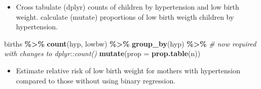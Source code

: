 \documentclass[
]{book}
\newenvironment{Shaded}{\begin{snugshade}}{\end{snugshade}}
\newcommand{\AttributeTok}[1]{\textcolor[rgb]{0.13,0.29,0.53}{#1}}
\newcommand{\CommentTok}[1]{\textcolor[rgb]{0.56,0.35,0.01}{\textit{#1}}}
\newcommand{\ConstantTok}[1]{\textcolor[rgb]{0.56,0.35,0.01}{#1}}
\newcommand{\DecValTok}[1]{\textcolor[rgb]{0.00,0.00,0.81}{#1}}
\newcommand{\FunctionTok}[1]{\textcolor[rgb]{0.13,0.29,0.53}{\textbf{#1}}}
\newcommand{\NormalTok}[1]{#1}
\newcommand{\OtherTok}[1]{\textcolor[rgb]{0.56,0.35,0.01}{#1}}
\newcommand{\SpecialCharTok}[1]{\textcolor[rgb]{0.81,0.36,0.00}{\textbf{#1}}}
\newcommand{\StringTok}[1]{\textcolor[rgb]{0.31,0.60,0.02}{#1}}
\providecommand{\tightlist}{%
  \setlength{\itemsep}{0pt}\setlength{\parskip}{0pt}}
\begin{document}
\begin{Shaded}
\end{Shaded}

\begin{itemize}
\tightlist
\item
  Cross tabulate (dplyr) counts of children by hypertension and low birth weight.
  calculate (mutate) proportions of low birth weigth children by hypertension.
\end{itemize}

\begin{Shaded}
\begin{Highlighting}[]
\NormalTok{births }\SpecialCharTok{\%\textgreater{}\%}
  \FunctionTok{count}\NormalTok{(hyp, lowbw) }\SpecialCharTok{\%\textgreater{}\%}
  \FunctionTok{group\_by}\NormalTok{(hyp) }\SpecialCharTok{\%\textgreater{}\%} \CommentTok{\# now required with changes to dplyr::count()}
  \FunctionTok{mutate}\NormalTok{(}\AttributeTok{prop =} \FunctionTok{prop.table}\NormalTok{(n))}
\end{Highlighting}
\end{Shaded}

\begin{itemize}
\tightlist
\item
  Estimate relative risk of low birth weight for mothers with hypertension compared to those without using binary regression.
\end{itemize}
\end{document}
